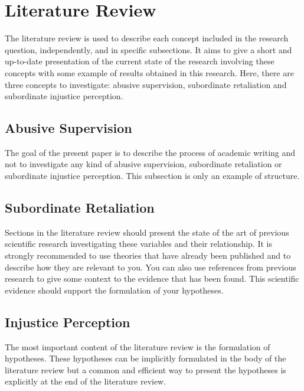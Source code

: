 \documentclass[
]{article}
\begin{document}
\hypertarget{literature-review}{%
\section{Literature Review}\label{literature-review}}

The literature review is used to describe each concept included in the
research question, independently, and in specific subsections. It aims
to give a short and up-to-date presentation of the current state of the
research involving these concepts with some example of results obtained
in this research. Here, there are three concepts to investigate: abusive
supervision, subordinate retaliation and subordinate injustice
perception.

\hypertarget{abusive-supervision}{%
\subsection{Abusive Supervision}\label{abusive-supervision}}

The goal of the present paper is to describe the process of academic
writing and not to investigate any kind of abusive supervision,
subordinate retaliation or subordinate injustice perception. This
subsection is only an example of structure.

\hypertarget{subordinate-retaliation}{%
\subsection{Subordinate Retaliation}\label{subordinate-retaliation}}

Sections in the literature review should present the state of the art of
previous scientific research investigating these variables and their
relationship. It is strongly recommended to use theories that have
already been published and to describe how they are relevant to you. You
can also use references from previous research to give some context to
the evidence that has been found. This scientific evidence should
support the formulation of your hypotheses.

\hypertarget{injustice-perception}{%
\subsection{Injustice Perception}\label{injustice-perception}}

The most important content of the literature review is the formulation
of hypotheses. These hypotheses can be implicitly formulated in the body
of the literature review but a common and efficient way to present the
hypotheses is explicitly at the end of the literature review.
\end{document}

